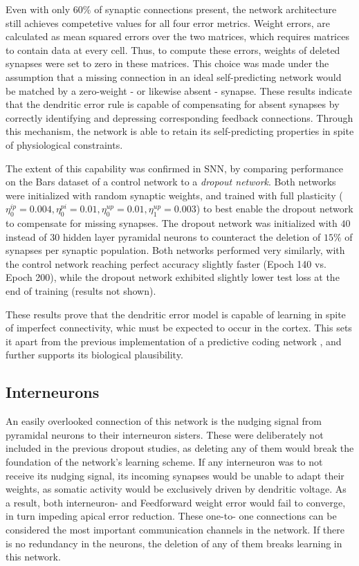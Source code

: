 Even with only 60\% of synaptic connections present, the network architecture still achieves competetive values for all
four error metrics. Weight errors, are calculated as mean squared errors over the two matrices, which requires matrices
to contain data at every cell. Thus, to compute these errors, weights of deleted synapses were set to zero in these
matrices. This choice was made under the assumption that a missing connection in an ideal self-predicting network would
be matched by a zero-weight - or likewise absent - synapse. These results indicate that the dendritic error rule is capable of
compensating for absent synapses by correctly identifying and depressing corresponding feedback connections. Through this 
mechanism, the network is able to retain its self-predicting properties in spite of physiological constraints.


The extent of this capability was confirmed in SNN, by comparing performance on the Bars dataset of a control network to
a \textit{dropout network}. Both networks were initialized with random synaptic weights, and trained with full
plasticity ($\eta^{ip}_0 = 0.004, \eta^{pi}_0 = 0.01, \eta^{up}_0 = 0.01, \eta^{up}_1 = 0.003$) to best enable the
dropout network to compensate for missing synapses. The dropout network was initialized with $40$ instead of $30$ hidden
layer pyramidal neurons to counteract the deletion of $15\%$ of synapses per synaptic population. Both networks
performed very similarly, with the control network reaching perfect accuracy slightly faster (Epoch 140 vs. Epoch 200),
while the dropout network exhibited slightly lower test loss at the end of training (results not shown). 

These results prove that the dendritic error model is capable of learning in spite of imperfect connectivity, whic must be
expected to occur in the cortex. This sets it apart from the previous implementation of a predictive coding network
\citep{Whittington2017}, and further supports its biological plausibility.


\subsection{Interneurons}

An easily overlooked connection of this network is the nudging signal from pyramidal neurons to their interneuron
sisters. These were deliberately not included in the previous dropout studies, as deleting any of them would break the
foundation of the network's learning scheme. If any interneuron was to not receive its nudging signal, its incoming
synapses would be unable to adapt their weights, as somatic activity would be exclusively driven by dendritic voltage.
As a result, both interneuron- and Feedforward weight error would fail to converge, in turn impeding apical error
reduction. These one-to- one connections can be considered the most important communication channels in the network. If
there is no redundancy in the neurons, the deletion of any of them breaks learning in this network.


